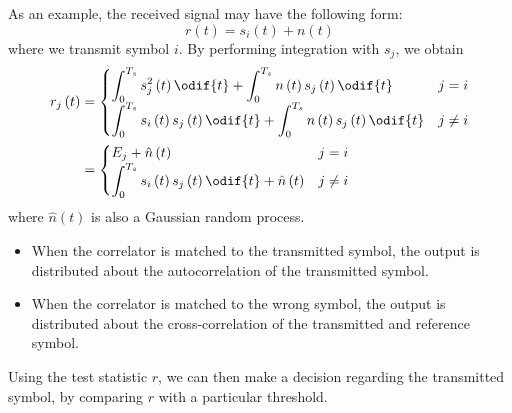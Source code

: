 \documentclass{article}
\begin{document}
As an example, the received signal may have the following form:
\begin{equation*}
    r\left( t \right) = s_i\left( t \right) + n\left( t \right)
\end{equation*}
where we transmit symbol \(i\).
By performing integration with \(s_j\), we obtain
\begin{align*}
    r_j\left( t \right) & =
    \begin{cases}
        \displaystyle\int_0^{T_s} s_j^2\left( t \right) \odif{t} + \int_0^{T_s} n\left( t \right) s_j\left( t \right) \odif{t}                   & j = i    \\
        \displaystyle\int_0^{T_s} s_i\left( t \right) s_j\left( t \right) \odif{t} + \int_0^{T_s} n\left( t \right) s_j\left( t \right) \odif{t} & j \neq i
    \end{cases}
    \\
                        & =
    \begin{cases}
        E_j + \hat{n}\left( t \right)                                                                        & j = i    \\
        \displaystyle\int_0^{T_s} s_i\left( t \right) s_j\left( t \right) \odif{t} + \hat{n}\left( t \right) & j \neq i
    \end{cases}
\end{align*}
where \(\hat{n}\left( t \right)\) is also a Gaussian random process.
\begin{itemize}
    \item When the correlator is matched to the transmitted symbol, the
          output is distributed about the autocorrelation of the
          transmitted symbol.
    \item When the correlator is matched to the wrong symbol, the
          output is distributed about the cross-correlation of the
          transmitted and reference symbol.
\end{itemize}
Using the test statistic \(r\), we can then make a decision regarding
the transmitted symbol, by comparing \(r\) with a particular threshold.
\end{document}
